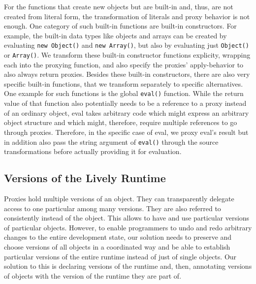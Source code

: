 For the functions that create new objects but are built-in and, thus, are not created from literal form, the transformation of literals and proxy behavior is not enough.
One category of such built-in functions are built-in constructors.
For example, the built-in data types like objects and arrays can be created by evaluating \lstinline{new Object()} and \lstinline{new Array()}, but also by evaluating just \lstinline{Object()} or \lstinline{Array()}.
We transform these built-in constructor functions explicity, wrapping each into the proxying function, and also specify the proxies' apply-behavior to also always return proxies.
Besides these built-in constructors, there are also very specific built-in functions, that we transform separately to specific alternatives.
One example for such functions is the global \lstinline{eval()} function.
While the return value of that function also potentially needs to be a reference to a proxy instead of an ordinary object, eval takes arbitrary code which might express an arbitrary object structure and which might, therefore, require multiple references to go through proxies.
Therefore, in the specific case of eval, we proxy eval's result but in addition also pass the string argument of \lstinline{eval()} through the source transformations before actually providing it for evaluation.


\subsection{Versions of the Lively Runtime} %

Proxies hold multiple versions of an object.
They can transparently delegate access to one particular among many versions.
They are also referred to consistently instead of the object.
This allows to have and use particular versions of particular objects.
However, to enable programmers to undo and redo arbitrary changes to the entire development state, our solution needs to preserve and choose versions of all objects in a coordinated way and be able to establish particular versions of the entire runtime instead of just of single objects.
Our solution to this is declaring versions of the runtime and, then, annotating versions of objects with the version of the runtime they are part of.




